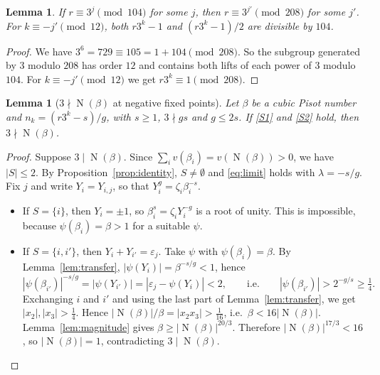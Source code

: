 \documentclass[11pt,a4paper]{article}
\newtheorem{lemma}[theorem]{Lemma}
\theoremstyle{definition}
\theoremstyle{remark}
\DeclareMathOperator{\Nm}{N}
\begin{document}
\begin{lemma}\label{lem:208}
If $r\equiv3^{j}\pmod{104}$ for some $j$, then $r\equiv3^{j'}\pmod{208}$ for some $j'$. For $k\equiv-j'\pmod{12}$, both $r3^k-1$ and $(r3^k-1)/2$ are divisible by $104$.
\end{lemma}
\begin{proof}
We have $3^6=729\equiv105=1+104\pmod{208}$. So the subgroup generated by $3$ modulo $208$ has order $12$ and contains both lifts of each power of $3$ modulo $104$.
For $k\equiv-j'\pmod{12}$ we get $r3^k\equiv1\pmod{208}$.
\end{proof}

\begin{lemma}[$3\nmid\Nm(\beta)$ at negative fixed points]\label{lem:3N}
Let $\beta$ be a cubic Pisot number and $n_k=(r3^k-s)/g$, with $s\ge1$, $3\nmid gs$ and $g\le2s$.
If \ref{S1} and \ref{S2} hold, then $3\nmid\Nm(\beta)$.
\end{lemma}
\begin{proof}
Suppose $3\mid\Nm(\beta)$.
Since $\sum_iv(\beta_i)=v(\Nm(\beta))>0$, we have $|S|\le2$. By Proposition~\ref{prop:identity}, $S\ne\emptyset$ and \eqref{eq:limit} holds with $\lambda=-s/g$.
Fix $j$ and write $Y_i=Y_{i,j}$, so that $Y_i^g=\zeta_i\beta_i^{-s}$.
\begin{itemize}
\item If $S=\{i\}$, then $Y_i=\pm1$, so $\beta_i^s=\zeta_iY_i^{-g}$ is a root of unity. This is impossible, because $\psi(\beta_i)=\beta>1$ for a suitable $\psi$.
\item If $S=\{i,i'\}$, then $Y_i+Y_{i'}=\varepsilon_j$. Take $\psi$ with $\psi(\beta_i)=\beta$. By Lemma~\ref{lem:transfer}, $|\psi(Y_i)|=\beta^{-s/g}<1$, hence
\[
 |\psi(\beta_{i'})|^{-s/g}=|\psi(Y_{i'})|=|\varepsilon_j-\psi(Y_i)|<2,\qquad\text{i.e.}\qquad|\psi(\beta_{i'})|>2^{-g/s}\ge\tfrac14 .
\]
Exchanging $i$ and $i'$ and using the last part of Lemma~\ref{lem:transfer}, we get $|x_2|,|x_3|>\frac14$. Hence $|\Nm(\beta)|/\beta=|x_2x_3|>\frac1{16}$, i.e.\ $\beta<16|\Nm(\beta)|$.
Lemma~\ref{lem:magnitude} gives $\beta\ge|\Nm(\beta)|^{20/3}$. Therefore $|\Nm(\beta)|^{17/3}<16$, so $|\Nm(\beta)|=1$, contradicting $3\mid\Nm(\beta)$.\qedhere
\end{itemize}
\end{proof}
\end{document}
